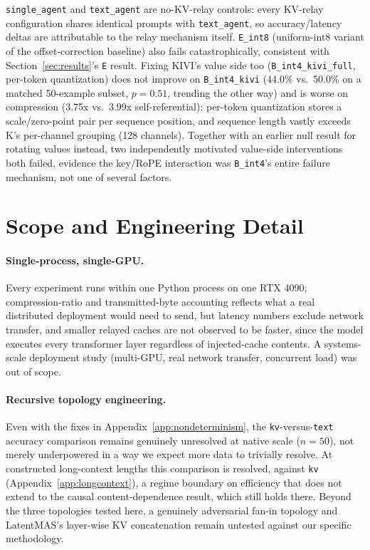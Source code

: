 \documentclass[11pt]{article}
\begin{document}
\texttt{single\_agent} and \texttt{text\_agent} are no-KV-relay
controls: every KV-relay configuration shares identical prompts with
\texttt{text\_agent}, so accuracy/latency deltas are attributable to
the relay mechanism itself. \texttt{E\_int8} (uniform-int8 variant of
the offset-correction baseline) also fails catastrophically, consistent
with Section~\ref{sec:results}'s \texttt{E} result. Fixing KIVI's value side
too (\texttt{B\_int4\_kivi\_full}, per-token quantization) does not
improve on \texttt{B\_int4\_kivi} (44.0\% vs.\ 50.0\% on a matched
50-example subset, $p=0.51$, trending the other way) and is worse on
compression (3.75x vs.\ 3.99x self-referential): per-token quantization
stores a scale/zero-point pair per sequence position, and sequence
length vastly exceeds K's per-channel grouping (128 channels). Together
with an earlier null result for rotating values instead, two
independently motivated value-side interventions both failed, evidence
the key/RoPE interaction was \texttt{B\_int4}'s entire failure
mechanism, not one of several factors.

\section{Scope and Engineering Detail}
\label{app:limitations}

\paragraph{Single-process, single-GPU.} Every experiment runs within
one Python process on one RTX 4090; compression-ratio and
transmitted-byte accounting reflects what a real distributed deployment
would need to send, but latency numbers exclude network transfer, and
smaller relayed caches are not observed to be faster, since the model
executes every transformer layer regardless of injected-cache contents.
A systems-scale deployment study (multi-GPU, real network transfer,
concurrent load) was out of scope.

\paragraph{Recursive topology engineering.} Even with the fixes in
Appendix~\ref{app:nondeterminism}, the \texttt{kv}-versus-\texttt{text}
accuracy comparison remains genuinely unresolved at native scale
($n=50$), not merely underpowered in a way we expect more data to
trivially resolve. At constructed long-context lengths this comparison
is resolved, against \texttt{kv} (Appendix~\ref{app:longcontext}), a
regime boundary on efficiency that does not extend to the causal
content-dependence result, which still holds there. Beyond the three
topologies tested here, a genuinely adversarial fan-in
topology \citep{latentagentslie2026} and LatentMAS's layer-wise KV
concatenation \citep{latentmas2026} remain untested against our
specific methodology.
\end{document}
